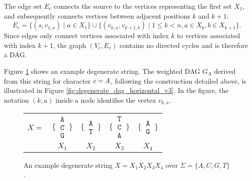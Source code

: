 The edge set $E_c$ connects the source to the vertices representing the first set $X_1$, and subsequently connects vertices between adjacent positions $k$ and $k+1$:
\[ E_c = \{ (s, v_{1,a}) \mid a \in X_1 \} \cup \{ (v_{k,a}, v_{k+1,b}) \mid 1 \le k < n, a \in X_k, b \in X_{k+1} \}. \]
Since edges only connect vertices associated with index $k$ to vertices associated with index $k+1$, the graph $(V_c, E_c)$ contains no directed cycles and is therefore a DAG.

Figure \ref{fig:degenerate_example_tabular_v3} shows an example degenerate string. The weighted DAG $G_A$ derived from this string for character $c = \emph{A}$, following the construction detailed above, is illustrated in Figure \ref{fig:degenerate_dag_horizontal_v3}. In the figure, the notation $(k,a)$ inside a node identifies the vertex $v_{k,a}$.

\begin{figure}[htbp]
    \centering
    \begin{tabular}{c@{\hskip 0.5em}c@{\hskip 0.5em}c@{\hskip 0.5em}c@{\hskip 0.5em}c}
        $X = $                                                                           & $\Bigg\{\,\begin{matrix}\texttt{A}\\\texttt{C}\\\texttt{G}\end{matrix}\,\Bigg\}$ &
        $\Bigg\{\,\begin{matrix}\texttt{A}\\\texttt{T}\end{matrix}\,\Bigg\}$             &
        $\Bigg\{\,\begin{matrix}\texttt{T}\\\texttt{C}\\\texttt{A}\end{matrix}\,\Bigg\}$ &
        $\Bigg\{\,\begin{matrix}\texttt{A}\\\texttt{G}\end{matrix}\,\Bigg\}$                                                                                                                        \\
                                                                                         & $X_1$                                                                            & $X_2$ & $X_3$ & $X_4$
    \end{tabular}
    \caption{An example degenerate string $X = X_1 X_2 X_3 X_4$ over $\Sigma = \{A, C, G, T\}$.}
    \label{fig:degenerate_example_tabular_v3}
\end{figure}

